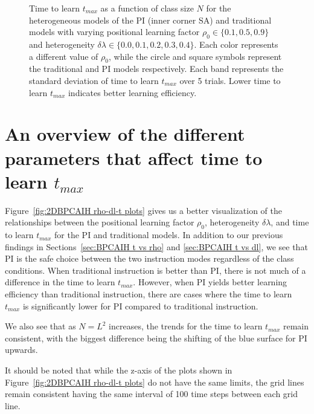 \begin{figure}[htbp!]
   \caption[Class size $N$ dependence of time to learn $t_{max}$ for the heterogeneous classroom model]{Time to learn $t_{max}$ as a function of class size $N$ for the heterogeneous models of the PI (inner corner SA) and traditional models with varying positional learning factor $\rho_0\in\lbrace 0.1, 0.5, 0.9 \rbrace$ and heterogeneity $\delta\lambda\in\lbrace0.0, 0.1, 0.2, 0.3, 0.4 \rbrace$. 
   Each color represents a different value of $\rho_0$, while the circle and square symbols represent the traditional and PI models respectively.
   Each band represents the standard deviation of time to learn $t_{max}$ over 5 trials.
   Lower time to learn $t_{max}$ indicates better learning efficiency.
   }
   \label{fig:2DBPCAIH n-t plots}
\end{figure}

\newpage %

\section{An overview of the different parameters that affect time to learn $t_{max}$}\label{sec:BPCAIH 3D plots}

Figure~\ref{fig:2DBPCAIH rho-dl-t plots} gives us a better visualization of the relationships between the positional learning factor $\rho_0$, heterogeneity $\delta\lambda$, and time to learn $t_{max}$ for the PI and traditional models.
In addition to our previous findings in Sections~\ref{sec:BPCAIH t vs rho} and \ref{sec:BPCAIH t vs dl}, we see that PI is the safe choice between the two instruction modes regardless of the class conditions.
When traditional instruction is better than PI, there is not much of a difference in the time to learn $t_{max}$.
However, when PI yields better learning efficiency than traditional instruction, there are cases where the time to learn $t_{max}$ is significantly lower for PI compared to traditional instruction.

We also see that as $N=L^2$ increases, the trends for the time to learn $t_{max}$ remain consistent, with the biggest difference being  the shifting of the blue surface for PI upwards.

It should be noted that while the z-axis of the plots shown in Figure~\ref{fig:2DBPCAIH rho-dl-t plots} do not have the same limits, the grid lines remain consistent having the same interval of 100 time steps between each grid line.

